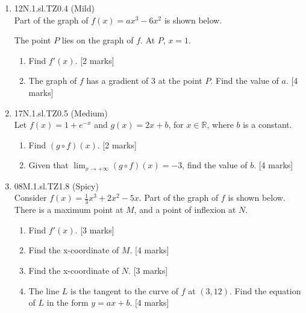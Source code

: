 \documentclass[12pt, twoside]{article}
\begin{document}
\begin{enumerate}
  \item 12N.1.sl.TZ0.4 (Mild)\\
  Part of the graph of $f(x)= ax^3-6x^2$ is shown below.
    \begin{center}
    \end{center}
    The point $P$ lies on the graph of $f$. At $P$, $x=1$.
    \begin{enumerate}
      \item Find $f'(x)$. [2 marks]
      \item The graph of $f$ has a gradient of 3 at the point $P$. Find the value of $a$. [4 marks]
    \end{enumerate}

    \item 17N.1.sl.TZ0.5 (Medium)\\
    Let $f(x)=1+e^{-x}$ and $g(x)=2x+b$, for $x \in \mathbb{R}$, where $b$ is a constant.
    \begin{enumerate}
      \item Find $(g \circ f)(x)$. [2 marks]
      \item Given that $\displaystyle \lim_{x \rightarrow +\infty} (g \circ f)(x) = -3$, find the value of $b$. [4 marks]
    \end{enumerate}

\newpage
    \item 08M.1.sl.TZ1.8 (Spicy)\\
    Consider $f(x)= \frac{1}{3} x^3+2x^2-5x$. Part of the graph of $f$ is shown below. There is a maximum point at $M$, and a point of inflexion at $N$.
      \begin{center}
      \end{center}
      \begin{enumerate}
        \item Find $f'(x)$. [3 marks]
        \item Find the x-coordinate of $M$. [4 marks]
        \item Find the x-coordinate of $N$. [3 marks]
        \item The line $L$ is the tangent to the curve of $f$ at $(3,12)$. Find the equation of $L$ in the form $y=ax+b$. [4 marks]
      \end{enumerate}


\end{enumerate}
\end{document}
